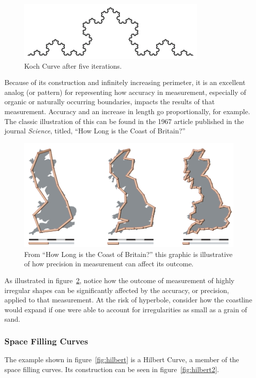 \documentclass[jou,apacite]{apa6}
\begin{document}
\begin{figure}[htpb]
  \centering
  \includegraphics[width=0.75\columnwidth]{images/Koch5.png}
  \caption{Koch Curve after five iterations.}
  \label{fig:koch52}
\end{figure}

Because of its construction and infinitely increasing perimeter, it is an excellent analog (or pattern) for representing how accuracy in measurement, especially of organic or naturally occurring boundaries, impacts the results of that measurement.  Accuracy and an increase in length go proportionally, for example.  The classic illustration of this can be found in the 1967 article published in the journal \emph{Science}, titled, ``How Long is the Coast of
Britain?''\cite{Britain}

\begin{figure}[htpb]
  \centering
  \includegraphics[width=0.75\columnwidth]{images/britain.png}
  \caption{From ``How Long is the Coast of Britain?'' this graphic is illustrative of how precision in measurement can affect its outcome.}
  \label{fig:britain}
\end{figure}

As illustrated in figure~\ref{fig:britain}, notice how the outcome of measurement of highly irregular shapes can be significantly affected by the accuracy, or precision, applied to that measurement.  At the risk of hyperbole, consider how the coastline would expand if one were able to account for irregularities as small as a grain of sand.

\subsubsection{Space Filling Curves}
The example shown in figure~\ref{fig:hilbert} is a Hilbert Curve, a member of the space filling curves.  Its construction can be seen in figure~\ref{fig:hilbert2}.  
\end{document}
